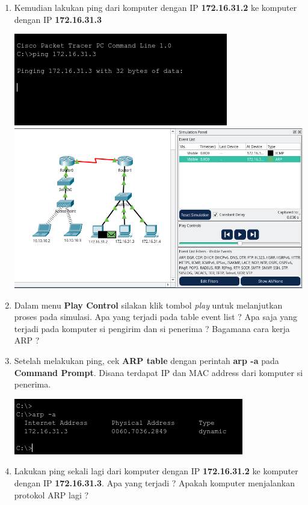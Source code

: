 \documentclass{article}
\begin{document}
\begin{flushleft}
\begin{enumerate}
            \item Kemudian lakukan ping dari komputer dengan IP \textbf{172.16.31.2} ke komputer dengan IP \textbf{172.16.31.3}
            
            \includegraphics[scale=0.6]{1-ping.png}
            \includegraphics[scale=0.5]{1-arp-sim.png}

            \item Dalam menu \textbf{Play Control} silakan klik tombol \textit{play} untuk melanjutkan proses pada simulasi.
            Apa yang terjadi pada table event list ?
            Apa saja yang terjadi pada komputer si pengirim dan si penerima ?
            Bagamana cara kerja ARP ?

            \item Setelah melakukan ping, cek \textbf{ARP table} dengan perintah \textbf{arp -a} pada \textbf{Command Prompt}. Disana terdapat IP dan MAC address dari komputer si penerima.
            
            \includegraphics{1-arp-a.png}

            \item Lakukan ping sekali lagi dari komputer dengan IP \textbf{172.16.31.2} ke komputer dengan IP \textbf{172.16.31.3}. Apa yang terjadi ? Apakah komputer menjalankan protokol ARP lagi ?
        \end{enumerate}
    \end{flushleft}
\end{document}

